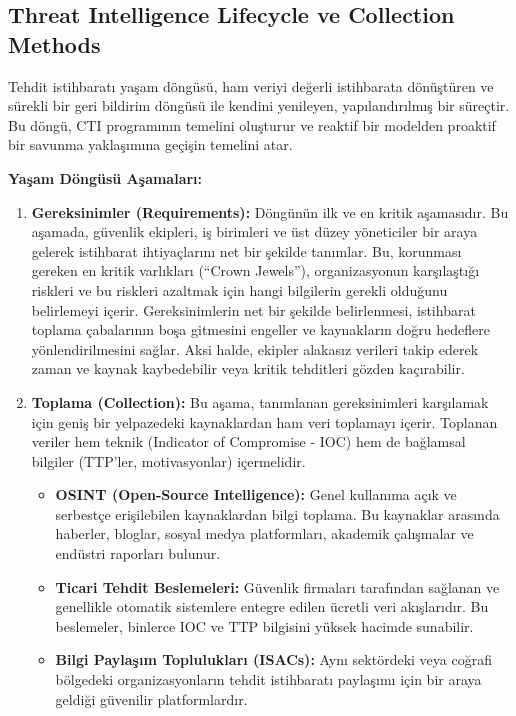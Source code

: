 \subsection{Threat Intelligence Lifecycle ve Collection Methods}

Tehdit istihbaratı yaşam döngüsü, ham veriyi değerli istihbarata dönüştüren ve sürekli bir geri bildirim döngüsü ile kendini yenileyen, yapılandırılmış bir süreçtir. Bu döngü, CTI programının temelini oluşturur ve reaktif bir modelden proaktif bir savunma yaklaşımına geçişin temelini atar.

\textbf{Yaşam Döngüsü Aşamaları:}

\begin{enumerate}
    \item \textbf{Gereksinimler (Requirements):} Döngünün ilk ve en kritik aşamasıdır. Bu aşamada, güvenlik ekipleri, iş birimleri ve üst düzey yöneticiler bir araya gelerek istihbarat ihtiyaçlarını net bir şekilde tanımlar. Bu, korunması gereken en kritik varlıkları (“Crown Jewels”), organizasyonun karşılaştığı riskleri ve bu riskleri azaltmak için hangi bilgilerin gerekli olduğunu belirlemeyi içerir. Gereksinimlerin net bir şekilde belirlenmesi, istihbarat toplama çabalarının boşa gitmesini engeller ve kaynakların doğru hedeflere yönlendirilmesini sağlar. Aksi halde, ekipler alakasız verileri takip ederek zaman ve kaynak kaybedebilir veya kritik tehditleri gözden kaçırabilir.
    \item \textbf{Toplama (Collection):} Bu aşama, tanımlanan gereksinimleri karşılamak için geniş bir yelpazedeki kaynaklardan ham veri toplamayı içerir. Toplanan veriler hem teknik (Indicator of Compromise - IOC) hem de bağlamsal bilgiler (TTP’ler, motivasyonlar) içermelidir.
    \begin{itemize}
        \item \textbf{OSINT (Open-Source Intelligence):} Genel kullanıma açık ve serbestçe erişilebilen kaynaklardan bilgi toplama. Bu kaynaklar arasında haberler, bloglar, sosyal medya platformları, akademik çalışmalar ve endüstri raporları bulunur.
        \item \textbf{Ticari Tehdit Beslemeleri:} Güvenlik firmaları tarafından sağlanan ve genellikle otomatik sistemlere entegre edilen ücretli veri akışlarıdır. Bu beslemeler, binlerce IOC ve TTP bilgisini yüksek hacimde sunabilir.
        \item \textbf{Bilgi Paylaşım Toplulukları (ISACs):} Aynı sektördeki veya coğrafi bölgedeki organizasyonların tehdit istihbaratı paylaşımı için bir araya geldiği güvenilir platformlardır.

\end{itemize}
\end{enumerate}
